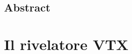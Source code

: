 \documentclass[10pt,a4paper,twoside]{report}
\begin{document}
\doublespacing
\tableofcontents
\singlespacing


\begin{comment}
\begin{frontespizio}
\Universita{Pisa}
\Logo[scale=.1]{logo}
\Dipartimento{Fisica}
\Corso{Fisica delle Interazioni Fondamentali}
\Titolo{Studio di rivelatori a pixel monolitici CMOS per l'upgrade dell'esperimento Belle II}
\Candidato{Mara Stefania Calo'}
\Relatore{prof. Francesco Forti}
\Annoaccademico{2022.2023}
\end{frontespizio}
\end{comment}

\newpage

\section*{Abstract}

\begin{comment}
Belle II è un esperimento di fisica delle particelle situato a Tsukuba, in Giappone, nel laboratorio (di) KEK (100 km da Tokyo). E' una flavor-factory di seconda generazione che opera alla frontiera dell'intensità, detenendo il record mondiale di maggiore luminosità. L'acceleratore SuperKEKB è un collider di fasci $e^{+}$ $e^{-}$ con energie asimmetriche e piccate alla risonanza $\Upsilon$(4S). Auspica a raccogliere un set di dati fino a 50 $ab^{-1}$ (x50 Belle dataset, x100 BaBar dataset) per studiare la violazione di CP nei mesoni B e ricerca nuova fisica oltre il Modello Standard.
\end{comment}










\chapter{Il rivelatore VTX}
\end{document}
